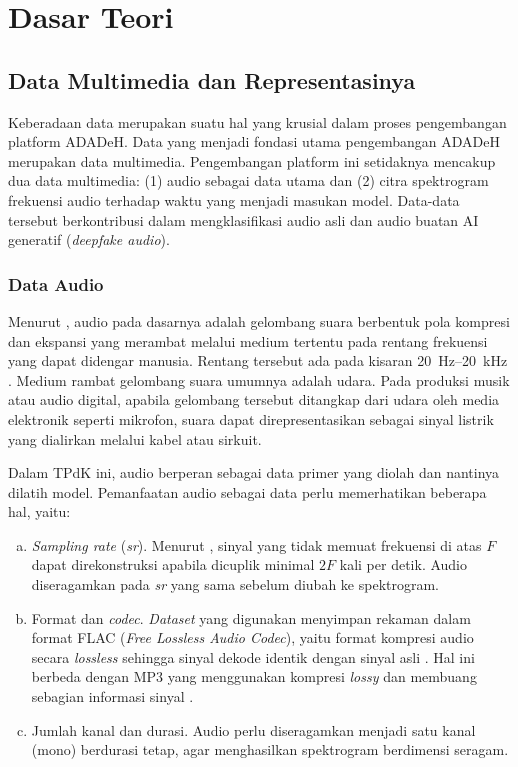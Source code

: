\cleardoublepage %
\chapter{Dasar Teori}
\label{chap:dasar-teori}

\section{Data Multimedia dan Representasinya}
\label{data_mm}

Keberadaan data merupakan suatu hal yang krusial dalam proses pengembangan platform ADADeH. Data yang menjadi fondasi utama pengembangan ADADeH merupakan data multimedia. Pengembangan platform ini setidaknya mencakup dua data multimedia: (1) audio sebagai data utama dan (2) citra spektrogram frekuensi audio terhadap waktu yang menjadi masukan model. Data-data tersebut berkontribusi dalam mengklasifikasi audio asli dan audio buatan AI generatif (\textit{deepfake audio}).

\subsection{Data Audio}
\label{data_audio}

Menurut \textcite{winer2025audio}, audio pada dasarnya adalah gelombang suara berbentuk pola kompresi dan ekspansi yang merambat melalui medium tertentu pada rentang frekuensi yang dapat didengar manusia. Rentang tersebut ada pada kisaran 20~Hz--20~kHz \autocite{wikipedia2026hearingrange}. Medium rambat gelombang suara umumnya adalah udara. Pada produksi musik atau audio digital, apabila gelombang tersebut ditangkap dari udara oleh media elektronik seperti mikrofon, suara dapat direpresentasikan sebagai sinyal listrik yang dialirkan melalui kabel atau sirkuit.

Dalam TPdK ini, audio berperan sebagai data primer yang diolah dan nantinya dilatih model. Pemanfaatan audio sebagai data perlu memerhatikan beberapa hal, yaitu:
\begin{enumerate}[(a).]
  \item \textit{Sampling rate} (\textit{sr}). Menurut \textcite{shannon1949}, sinyal yang tidak memuat frekuensi di atas $F$ dapat direkonstruksi apabila dicuplik minimal $2F$ kali per detik. Audio diseragamkan pada \textit{sr} yang sama sebelum diubah ke spektrogram.
  \item Format dan \textit{codec}. \textit{Dataset} yang digunakan menyimpan rekaman dalam format FLAC (\textit{Free Lossless Audio Codec}), yaitu format kompresi audio secara \textit{lossless} sehingga sinyal dekode identik dengan sinyal asli \autocite{rfc9639flac}. Hal ini berbeda dengan MP3 yang menggunakan kompresi \textit{lossy} dan membuang sebagian informasi sinyal \autocite{brandenburg1999mp3}.
  \item Jumlah kanal dan durasi. Audio perlu diseragamkan menjadi satu kanal (mono) berdurasi tetap, agar menghasilkan spektrogram berdimensi seragam.
\end{enumerate}

